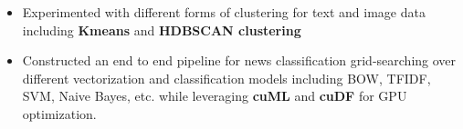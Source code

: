 \documentclass[letterpaper,11pt]{article}
\makeatletter
\newcommand{\resitem}[1]{\item #1 \vspace{-8pt}}
\newcommand{\ressubheadingsmol}[2]{\vspace{1pt}
\begin{tabular*}{7.0in}{l@{\cftdotfill{\cftsecdotsep}\extracolsep{\fill}}r}
		\textbf{#1} & \textit{#2} \\
\end{tabular*}\vspace{-6pt}}
\makeatother
\begin{document}
\begin{itemize}
    \resitem{Experimented with  different forms of clustering for text and image data including \textbf{Kmeans} and  \textbf{HDBSCAN clustering}}
    \resitem{Constructed an end to end pipeline for news classification grid-searching over different vectorization and classification models including BOW, TFIDF, SVM, Naive Bayes, etc. while leveraging \textbf{cuML} and \textbf{cuDF} for GPU optimization.}
\end{itemize}

\end{document}
